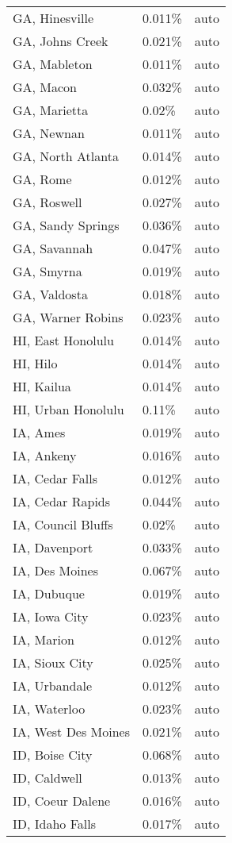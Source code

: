 \begin{longtable}[]{@{}lll@{}}
GA, Hinesville & 0.011\% & auto \\
GA, Johns Creek & 0.021\% & auto \\
GA, Mableton & 0.011\% & auto \\
GA, Macon & 0.032\% & auto \\
GA, Marietta & 0.02\% & auto \\
GA, Newnan & 0.011\% & auto \\
GA, North Atlanta & 0.014\% & auto \\
GA, Rome & 0.012\% & auto \\
GA, Roswell & 0.027\% & auto \\
GA, Sandy Springs & 0.036\% & auto \\
GA, Savannah & 0.047\% & auto \\
GA, Smyrna & 0.019\% & auto \\
GA, Valdosta & 0.018\% & auto \\
GA, Warner Robins & 0.023\% & auto \\
HI, East Honolulu & 0.014\% & auto \\
HI, Hilo & 0.014\% & auto \\
HI, Kailua & 0.014\% & auto \\
HI, Urban Honolulu & 0.11\% & auto \\
IA, Ames & 0.019\% & auto \\
IA, Ankeny & 0.016\% & auto \\
IA, Cedar Falls & 0.012\% & auto \\
IA, Cedar Rapids & 0.044\% & auto \\
IA, Council Bluffs & 0.02\% & auto \\
IA, Davenport & 0.033\% & auto \\
IA, Des Moines & 0.067\% & auto \\
IA, Dubuque & 0.019\% & auto \\
IA, Iowa City & 0.023\% & auto \\
IA, Marion & 0.012\% & auto \\
IA, Sioux City & 0.025\% & auto \\
IA, Urbandale & 0.012\% & auto \\
IA, Waterloo & 0.023\% & auto \\
IA, West Des Moines & 0.021\% & auto \\
ID, Boise City & 0.068\% & auto \\
ID, Caldwell & 0.013\% & auto \\
ID, Coeur Dalene & 0.016\% & auto \\
ID, Idaho Falls & 0.017\% & auto \\

\end{longtable}
